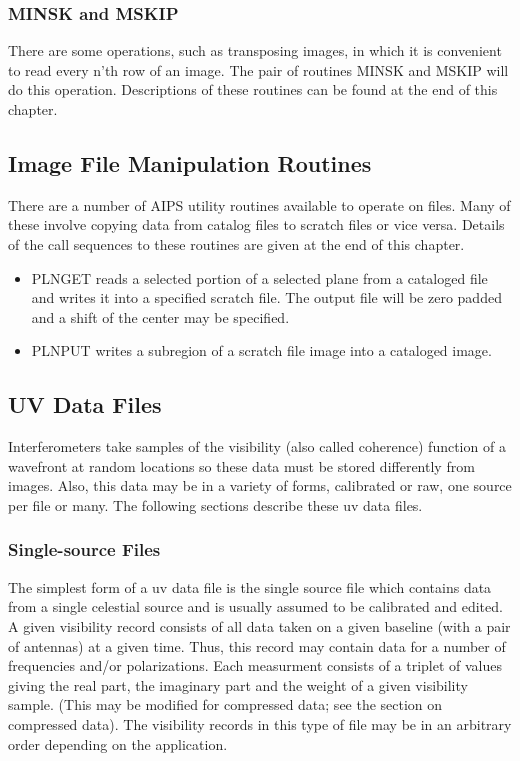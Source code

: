 \begin{verbatim}
\end{verbatim}
\subsubsection{MINSK and MSKIP}
There are some operations, such as transposing images, in which it is
convenient to read every n'th row of an image.  The pair of routines
MINSK and MSKIP will do this operation.  Descriptions of these
routines can be found at the end of this chapter.


\subsection{Image File Manipulation Routines}
There are a number of AIPS utility routines available to operate on
files.  Many of these involve copying data from catalog files to
scratch files or vice versa. Details of the call sequences to these
routines are given at the end of this chapter.
\begin{itemize} %
\item PLNGET reads a selected portion of a selected plane from a cataloged
file  and writes it into a specified scratch file. The output file
will be zero padded and a shift of the center may be specified.
\item PLNPUT writes a subregion of a scratch file image into a cataloged
image.
\end{itemize} %

\subsection{UV Data Files}

Interferometers take samples of the visibility (also called coherence)
function of a wavefront at random locations so these data must be
stored differently from images.  Also, this data may be in a variety of
forms, calibrated or raw, one source per file or many.  The following
sections describe these uv data files.

\subsubsection{Single-source Files}

The simplest form of a uv data file is the single source file which
contains data from a single celestial source and is usually assumed to
be calibrated and edited.  A given visibility record consists of all
data taken on a given baseline (with a pair of antennas) at a given
time.  Thus, this record may contain data for a number of frequencies
and/or polarizations.  Each measurment consists of a triplet of values
giving the real part, the imaginary part and the weight of a given
visibility sample.  (This may be modified for compressed data; see the
section on compressed data).  The visibility records in this type of
file may be in an arbitrary order depending on the application.

